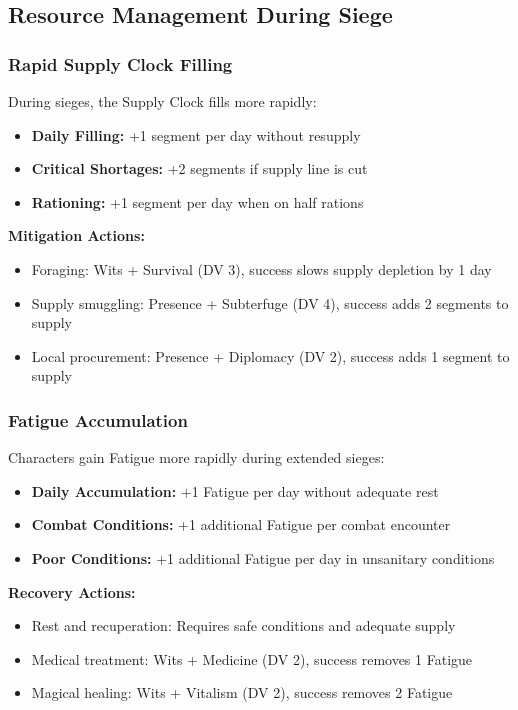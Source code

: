 \documentclass[11pt,letterpaper]{article}
\begin{document}
\subsection{Resource Management During Siege}

\subsubsection{Rapid Supply Clock Filling}

During sieges, the Supply Clock fills more rapidly:
\begin{itemize}[leftmargin=*]
    \item \textbf{Daily Filling:} +1 segment per day without resupply
    \item \textbf{Critical Shortages:} +2 segments if supply line is cut
    \item \textbf{Rationing:} +1 segment per day when on half rations
\end{itemize}

\textbf{Mitigation Actions:}
\begin{itemize}[leftmargin=*]
    \item Foraging: Wits + Survival (DV 3), success slows supply depletion by 1 day
    \item Supply smuggling: Presence + Subterfuge (DV 4), success adds 2 segments to supply
    \item Local procurement: Presence + Diplomacy (DV 2), success adds 1 segment to supply
\end{itemize}

\subsubsection{Fatigue Accumulation}

Characters gain Fatigue more rapidly during extended sieges:
\begin{itemize}[leftmargin=*]
    \item \textbf{Daily Accumulation:} +1 Fatigue per day without adequate rest
    \item \textbf{Combat Conditions:} +1 additional Fatigue per combat encounter
    \item \textbf{Poor Conditions:} +1 additional Fatigue per day in unsanitary conditions
\end{itemize}

\textbf{Recovery Actions:}
\begin{itemize}[leftmargin=*]
    \item Rest and recuperation: Requires safe conditions and adequate supply
    \item Medical treatment: Wits + Medicine (DV 2), success removes 1 Fatigue
    \item Magical healing: Wits + Vitalism (DV 2), success removes 2 Fatigue
\end{itemize}
\end{document}
